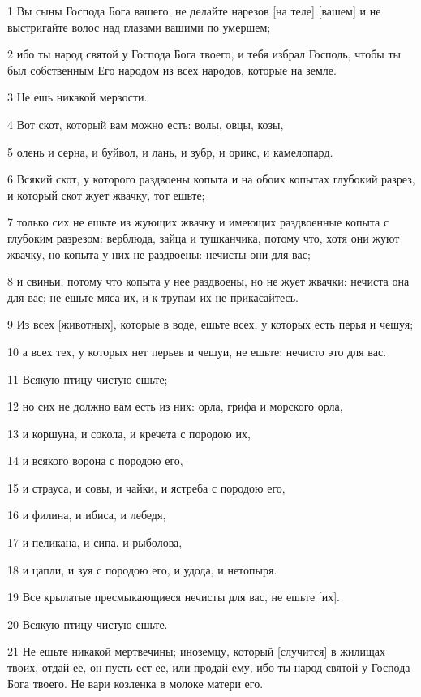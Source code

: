 \par 1 Вы сыны Господа Бога вашего; не делайте нарезов [на теле] [вашем] и не выстригайте волос над глазами вашими по умершем;
\par 2 ибо ты народ святой у Господа Бога твоего, и тебя избрал Господь, чтобы ты был собственным Его народом из всех народов, которые на земле.
\par 3 Не ешь никакой мерзости.
\par 4 Вот скот, который вам можно есть: волы, овцы, козы,
\par 5 олень и серна, и буйвол, и лань, и зубр, и орикс, и камелопард.
\par 6 Всякий скот, у которого раздвоены копыта и на обоих копытах глубокий разрез, и который скот жует жвачку, тот ешьте;
\par 7 только сих не ешьте из жующих жвачку и имеющих раздвоенные копыта с глубоким разрезом: верблюда, зайца и тушканчика, потому что, хотя они жуют жвачку, но копыта у них не раздвоены: нечисты они для вас;
\par 8 и свиньи, потому что копыта у нее раздвоены, но не жует жвачки: нечиста она для вас; не ешьте мяса их, и к трупам их не прикасайтесь.
\par 9 Из всех [животных], которые в воде, ешьте всех, у которых есть перья и чешуя;
\par 10 а всех тех, у которых нет перьев и чешуи, не ешьте: нечисто это для вас.
\par 11 Всякую птицу чистую ешьте;
\par 12 но сих не должно вам есть из них: орла, грифа и морского орла,
\par 13 и коршуна, и сокола, и кречета с породою их,
\par 14 и всякого ворона с породою его,
\par 15 и страуса, и совы, и чайки, и ястреба с породою его,
\par 16 и филина, и ибиса, и лебедя,
\par 17 и пеликана, и сипа, и рыболова,
\par 18 и цапли, и зуя с породою его, и удода, и нетопыря.
\par 19 Все крылатые пресмыкающиеся нечисты для вас, не ешьте [их].
\par 20 Всякую птицу чистую ешьте.
\par 21 Не ешьте никакой мертвечины; иноземцу, который [случится] в жилищах твоих, отдай ее, он пусть ест ее, или продай ему, ибо ты народ святой у Господа Бога твоего. Не вари козленка в молоке матери его.
